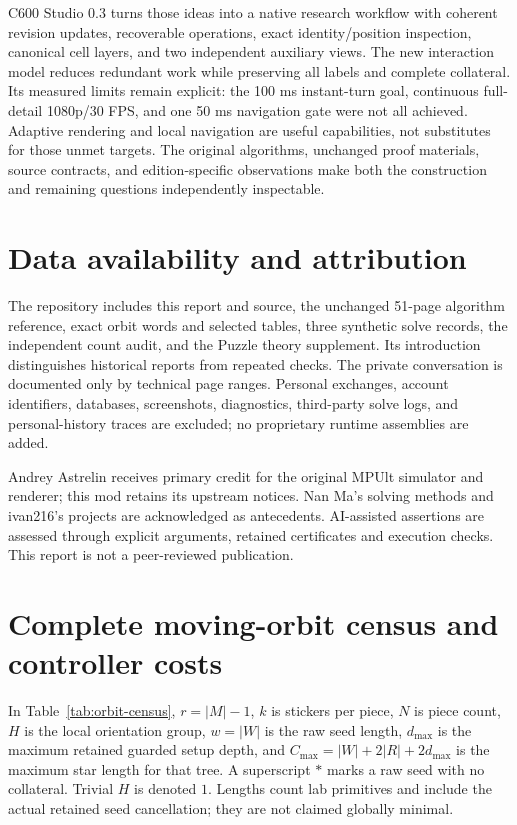 \documentclass[a4paper,11pt]{article}
\begin{document}
C600 Studio 0.3 turns those ideas into a native research workflow with coherent revision updates, recoverable operations, exact identity/position inspection, canonical cell layers, and two independent auxiliary views. The new interaction model reduces redundant work while preserving all labels and complete collateral. Its measured limits remain explicit: the 100 ms instant-turn goal, continuous full-detail 1080p/30 FPS, and one 50 ms navigation gate were not all achieved. Adaptive rendering and local navigation are useful capabilities, not substitutes for those unmet targets. The original algorithms, unchanged proof materials, source contracts, and edition-specific observations make both the construction and remaining questions independently inspectable.

\section*{Data availability and attribution}


The repository includes this report and source, the unchanged 51-page algorithm reference, exact orbit words and selected tables, three synthetic solve records, the independent count audit, and the Puzzle theory supplement. Its introduction distinguishes historical reports from repeated checks. The private conversation is documented only by technical page ranges. Personal exchanges, account identifiers, databases, screenshots, diagnostics, third-party solve logs, and personal-history traces are excluded; no proprietary runtime assemblies are added.

Andrey Astrelin receives primary credit for the original MPUlt simulator and renderer; this mod retains its upstream notices. Nan Ma's solving methods and ivan216's projects are acknowledged as antecedents. AI-assisted assertions are assessed through explicit arguments, retained certificates and execution checks. This report is not a peer-reviewed publication.


\clearpage
\appendix
\section{Complete moving-orbit census and controller costs}
\label{app:census}

In Table~\ref{tab:orbit-census}, \(r=|M|-1\), \(k\) is stickers per piece, \(N\) is piece count, \(H\) is the local orientation group, \(w=|W|\) is the raw seed length, \(d_{\max}\) is the maximum retained guarded setup depth, and \(C_{\max}=|W|+2|R|+2d_{\max}\) is the maximum star length for that tree. A superscript \(*\) marks a raw seed with no collateral. Trivial \(H\) is denoted \(1\). Lengths count lab primitives and include the actual retained seed cancellation; they are not claimed globally minimal.
\end{document}
